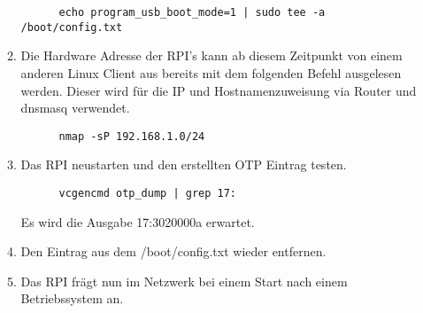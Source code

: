 \begin{enumerate}
\begin{enumerate}
      \begin{verbatim}
      echo program_usb_boot_mode=1 | sudo tee -a /boot/config.txt
      \end{verbatim}
      \item Die Hardware Adresse der RPI's kann ab diesem Zeitpunkt von einem anderen Linux Client aus bereits mit dem folgenden Befehl ausgelesen werden. Dieser wird für die IP und Hostnamenzuweisung via Router und dnsmasq verwendet.
      \begin{verbatim}
	  nmap -sP 192.168.1.0/24
      \end{verbatim}
      \item Das RPI neustarten und den erstellten OTP Eintrag testen.
      \begin{verbatim}
      vcgencmd otp_dump | grep 17:
      \end{verbatim}
      Es wird die Ausgabe 17:3020000a erwartet.
      \item Den Eintrag aus dem /boot/config.txt wieder entfernen.
      \item Das RPI frägt nun im Netzwerk bei einem Start nach einem Betriebssystem an.
      \end{enumerate}
   \end{enumerate}
